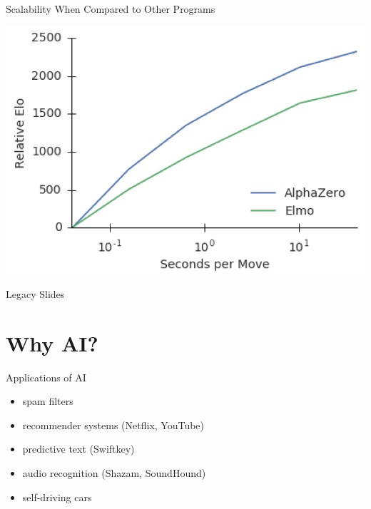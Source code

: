 \documentclass{beamer}
\begin{document}
{\begin{frame}{Scalability When Compared to Other Programs}
\begin{center}
        \pause
        \includegraphics[height=.45\textheight]{../img/AlphaZero-paper/scalability-against-elmo.png}
      \end{center}
    \end{frame}
  }


  \begin{frame}[standout]
    Legacy Slides
  \end{frame}

  \section{Why AI?}

  \begin{frame}{Applications of AI}
    \begin{itemize}[<+- | alert@+>]
      \item spam filters
      \item recommender systems (Netflix, YouTube)
      \item predictive text (Swiftkey)
      \item audio recognition (Shazam, SoundHound)
      \item self-driving cars
    \end{itemize}
  \end{frame}
\end{document}
